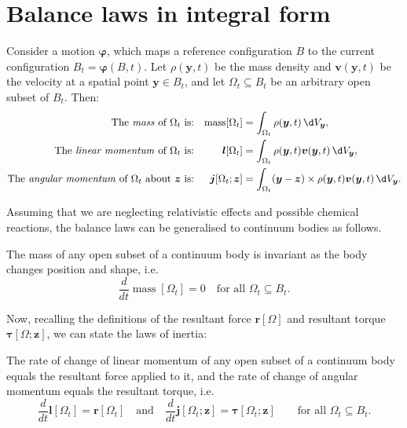 \documentclass[
  letterpaper,
  DIV=11,
  numbers=noendperiod]{scrreprt}
\theoremstyle{plain}
\theoremstyle{remark}
\begin{document}
\section{Balance laws in integral
form}\label{balance-laws-in-integral-form}

Consider a motion \({\boldsymbol{\varphi}}\), which maps a reference
configuration \(B\) to the current configuration
\(B_t={\boldsymbol{\varphi}}(B,t)\). Let \(\rho({\boldsymbol{y}},t)\) be
the mass density and \({\boldsymbol{v}}({\boldsymbol{y}},t)\) be the
velocity at a spatial point \({\boldsymbol{y}}\in B_t\), and let
\(\Omega_t\subseteq B_t\) be an arbitrary open subset of \(B_t\). Then:
\[\begin{aligned}
    \text{The \emph{mass} of $\Omega_t$ is:}&&{\operatorname{mass}}[\Omega_t] &= \int_{\Omega_t}\rho({\boldsymbol{y}},t){\,\d V_{{\boldsymbol{y}}}},\\
    \text{The \emph{linear momentum} of $\Omega_t$ is:}&&{\boldsymbol{l}}[\Omega_t] &= \int_{\Omega_t}\rho({\boldsymbol{y}},t){\boldsymbol{v}}({\boldsymbol{y}},t){\,\d V_{{\boldsymbol{y}}}},\\
    \text{The \emph{angular momentum} of $\Omega_t$ about ${\boldsymbol{z}}$ is:}&&{\boldsymbol{j}}[\Omega_t;{\boldsymbol{z}}] &= \int_{\Omega_t}({\boldsymbol{y}}-{\boldsymbol{z}})\times \rho({\boldsymbol{y}},t){\boldsymbol{v}}({\boldsymbol{y}},t){\,\d V_{{\boldsymbol{y}}}}.
  \end{aligned}\]

Assuming that we are neglecting relativistic effects and possible
chemical reactions, the balance laws can be generalised to continuum
bodies as follows.

\label{ax:ConservationOfMass}{}
\label{ax:massconservation}{} The mass of any open subset
of a continuum body is invariant as the body changes position and shape,
i.e.
\[\frac{d}{dt}{\operatorname{mass}}[\Omega_t] = 0\quad\text{for all }\Omega_t\subseteq B_t.\]

Now, recalling the definitions of the resultant force
\({\boldsymbol{r}}[\Omega]\) and resultant torque
\({\boldsymbol{\tau}}[\Omega;{\boldsymbol{z}}]\), we can state the laws
of inertia:

\label{ax:LawsOfInertia}{}
\label{ax:lawsofinertia}{} The rate of change of linear
momentum of any open subset of a continuum body equals the resultant
force applied to it, and the rate of change of angular momentum equals
the resultant torque, i.e.
\[\frac{d}{dt}{\boldsymbol{l}}[\Omega_t] = {\boldsymbol{r}}[\Omega_t]\quad\text{and}\quad \frac{d}{dt}{\boldsymbol{j}}[\Omega_t;{\boldsymbol{z}}]={\boldsymbol{\tau}}[\Omega_t;{\boldsymbol{z}}]\qquad\text{for all }\Omega_t\subseteq B_t.\]
\end{document}
